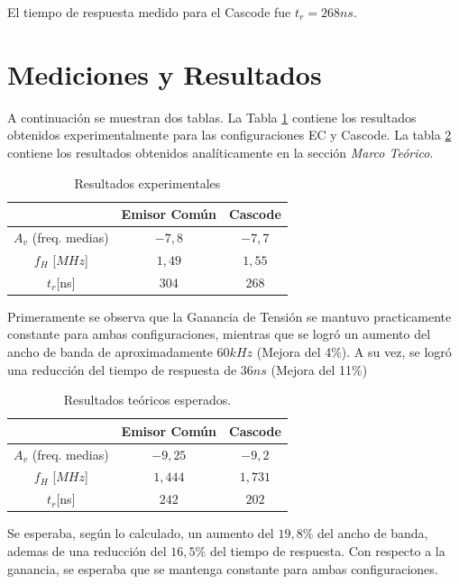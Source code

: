 \documentclass[letterpaper, 10 pt, conference]{ieeeconf}  %
\begin{document}
El tiempo de respuesta medido para el Cascode fue $t_r = 268ns$.

\section{Mediciones y Resultados}

A continuación se muestran dos tablas. La Tabla \ref{tab:resultados_exp} contiene los resultados obtenidos experimentalmente para las configuraciones EC y Cascode. La tabla \ref{tab:resultados_teoricos} contiene los resultados obtenidos analíticamente en la sección \textit{Marco Teórico}.

\begin{table}[h]
\begin{center}
\begin{tabular}{|c||c|c|}
\hline
 & Emisor Común & Cascode \\
\hline
$A_v$ (freq. medias)  & $-7,8$ & $-7,7$ \\
\hline
$f_H$ [$MHz$] & $1,49$ & $1,55$ \\
\hline
$t_r [$ns$]$ & $304$ & $268$ \\
\hline
\end{tabular}
\end{center}
\caption{Resultados experimentales}
\label{tab:resultados_exp}
\end{table}

Primeramente se observa que la Ganancia de Tensión se mantuvo practicamente constante para ambas configuraciones, mientras que se logró un aumento del ancho de banda de aproximadamente $60kHz$ (Mejora del 4\%).
A su vez, se logró una reducción del tiempo de respuesta de $36ns$ (Mejora del 11\%)

\begin{table}[h]
\begin{center}
\begin{tabular}{|c||c|c|}
\hline
 & Emisor Común & Cascode \\
\hline
$A_v$ (freq. medias)  & $-9,25$ & $-9,2$ \\
\hline
$f_H$ [$MHz$] & $1,444$ & $1,731$ \\
\hline
$t_r [$ns$]$ & $242$ & $202$ \\
\hline
\end{tabular}
\end{center}
\caption{Resultados teóricos esperados.}
\label{tab:resultados_teoricos}
\end{table}

Se esperaba, según lo calculado, un aumento del $19,8\%$ del ancho de banda, ademas de una reducción del $16,5\%$ del tiempo de respuesta.
Con respecto a la ganancia, se esperaba que se mantenga constante para ambas configuraciones.\\
\end{document}
